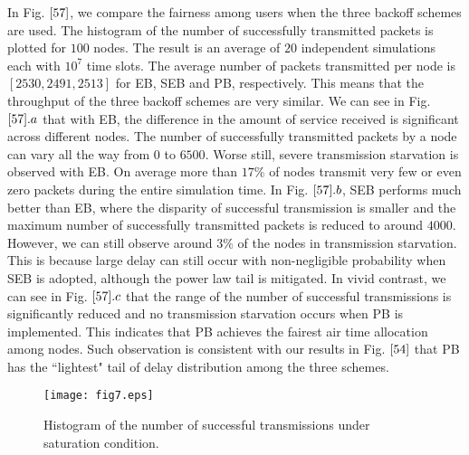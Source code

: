 \documentclass[journal]{IEEEtran}
\begin{document}
In Fig. $\ref{57}$, we compare the fairness among users when the three backoff schemes are used. The histogram of the number of successfully transmitted packets is plotted for $100$ nodes. The result is an average of $20$ independent simulations each with $10^7$ time slots. The average number of packets transmitted per node is $[2530,2491,2513]$ for EB, SEB and PB, respectively. This means that the throughput of the three backoff schemes are very similar. We can see in Fig. $\ref{57}.a$ that with EB, the difference in the amount of service received is significant across different nodes. The number of successfully transmitted packets by a node can vary all the way from $0$ to $6500$. Worse still, severe transmission starvation is observed with EB. On average more than $17\%$ of nodes transmit very few or even zero packets during the entire simulation time. In Fig. $\ref{57}.b$, SEB performs much better than EB, where the disparity of successful transmission is smaller and the maximum number of successfully transmitted packets is reduced to around $4000$. However, we can still observe around $3\%$ of the nodes in transmission starvation. This is because large delay can still occur with non-negligible probability when SEB is adopted, although the power law tail is mitigated. In vivid contrast, we can see in Fig. $\ref{57}.c$ that the range of the number of successful transmissions is significantly reduced and no transmission starvation occurs when PB is implemented. This indicates that PB achieves the fairest air time allocation among nodes. Such observation is consistent with our results in Fig. $\ref{54}$ that PB has the ``lightest" tail of delay distribution among the three schemes.


\begin{figure}
\centering
  \begin{center}
    \texttt{[image: fig7.eps]}
  \end{center}
  \caption{Histogram of the number of successful transmissions under saturation condition.}
  \label{57}
\end{figure}
\end{document}
